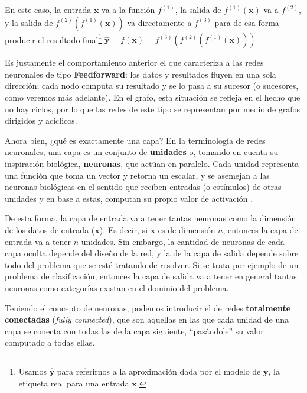\documentclass[../../main.tex]{subfiles}
\begin{document}
En este caso, la entrada \(\bm{x}\) va a la función \(f^{(1)}\), la salida de
\(f^{(1)}(\bm{x})\) va a \(f^{(2)}\), y la salida de \(f^{(2)}(f^{(1)}(\bm{x}))\) va
directamente a \(f^{(3)}\) para de esa forma producir el resultado final\footnote{Usamos
\(\bm{\hat{y}}\) para referirnos a la aproximación dada por el modelo de \(\bm{y}\), la
etiqueta real para una entrada \(\bm{x}\).} \(\bm{\hat{y}} = f(\bm{x}) =
f^{(3)}(f^{(2)}(f^{(1)}(\bm{x})))\).

Es justamente el comportamiento anterior el que caracteriza a las redes neuronales de tipo
\textbf{Feedforward}: los datos y resultados fluyen en una sola dirección; cada
nodo computa su resultado y se lo pasa a su sucesor (o sucesores, como veremos más
adelante). En el grafo, esta situación se refleja en el hecho que no hay ciclos, por lo
que las redes de este tipo se representan por medio de grafos dirigidos y acíclicos.

Ahora bien, ¿qué es exactamente una capa? En la terminología de redes neuronales, una capa
es un conjunto de \textbf{unidades} o, tomando en cuenta su inspiración biológica,
\textbf{neuronas}, que actúan en paralelo. Cada unidad representa una función que toma un
vector y retorna un escalar, y se asemejan a las neuronas biológicas en el sentido que
reciben entradas (o estímulos) de otras unidades y en base a estas, computan su propio
valor de activación \cite{deep-learning}.

De esta forma, la capa de entrada va a tener tantas neuronas como la dimensión de los
datos de entrada (\(\bm{x}\)). Es decir, si \(\bm{x}\) es de dimensión \(n\), entonces la
capa de entrada va a tener \(n\) unidades. Sin embargo, la cantidad de neuronas de cada
capa oculta depende del diseño de la red, y la de la capa de salida depende sobre todo del
problema que se esté tratando de resolver. Si se trata por ejemplo de un problema de
clasificación, entonces la capa de salida va a tener en general tantas neuronas como
categorías existan en el dominio del problema.

Teniendo el concepto de neuronas, podemos introducir el de redes \textbf{totalmente
conectadas} (\textit{fully connected}), que son aquellas en las que cada unidad de una
capa se conecta con todas las de la capa siguiente, ``pasándole'' su valor computado
a todas ellas.
\end{document}
